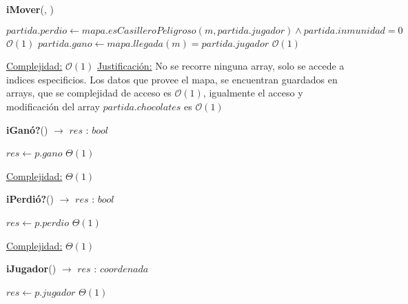 \documentclass[10pt, a4paper]{article}
\newcommand{\bigO}{\mathcal{O}}
\begin{document}
\begin{Algoritmos}
\begin{algorithm}[H]{\textbf{iMover}(, )}
\begin{algorithmic}[1]
                        \State $partida.perdio \gets mapa.esCasilleroPeligroso(m, partida.jugador) \wedge partida.inmunidad = 0$    \Comment $\bigO(1)$
                        \State $partida.gano \gets mapa.llegada(m) = partida.jugador$                                               \Comment $\bigO(1)$

                    \EndIf

                    \medskip
                    \Statex \underline{Complejidad:} $\bigO(1)$
                    \Statex \underline{Justificación:} No se recorre ninguna array, solo se accede a indices especificios. Los datos que provee el mapa, se encuentran guardados en arrays, que se complejidad de acceso es $\bigO(1)$, igualmente el acceso y modificación del array $partida.chocolates$ es $\bigO(1)$
                \end{algorithmic}
        \end{algorithm}
            

        \begin{algorithm}[H]{\textbf{iGanó?}() $\to$ $res$ : $bool$}
            \begin{algorithmic}[1]
                    \State $res \gets p.gano$                                                                   \Comment $\Theta(1)$

                    \medskip
                    \Statex \underline{Complejidad:} $\Theta(1)$
                \end{algorithmic}
        \end{algorithm}

        \begin{algorithm}[H]{\textbf{iPerdió?}() $\to$ $res$ : $bool$}
            \begin{algorithmic}[1]
                    \State $res \gets p.perdio$                                                                 \Comment $\Theta(1)$

                    \medskip
                    \Statex \underline{Complejidad:} $\Theta(1)$
                \end{algorithmic}
        \end{algorithm}

        \begin{algorithm}[H]{\textbf{iJugador}() $\to$ $res$ : $coordenada$}
            \begin{algorithmic}[1]
                    \State $res \gets p.jugador$                                                               \Comment $\Theta(1)$


\end{algorithmic}
\end{algorithm}
\end{Algoritmos}
\end{document}
